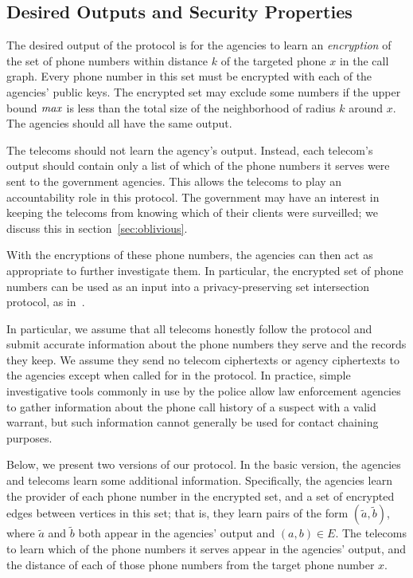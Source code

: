 \subsection{Desired Outputs and Security Properties}

The desired output of the protocol is for the agencies to learn an \emph{encryption} of the set of phone numbers within distance $k$ of the targeted phone $x$ in the call graph. Every phone number in this set must be encrypted with each of the agencies' public keys. The encrypted set may exclude some numbers if the upper bound $\mathit{max}$ is less than the total size of the neighborhood of radius $k$ around $x$. The agencies should all have the same output.

The telecoms should not learn the agency's output. Instead, each telecom's output should contain only a list of which of the phone numbers it serves were sent to the government agencies. This allows the telecoms to play an accountability role in this protocol. The government may have an interest in keeping the telecoms from knowing which of their clients were surveilled; we discuss this in section~\ref{sec:oblivious}.

With the encryptions of these phone numbers, the agencies can then act as appropriate to further investigate them. In particular, the encrypted set of phone numbers can be used as an input into a privacy-preserving set intersection protocol, as in~\cite{bandits}.

In particular, we assume that all telecoms honestly follow the protocol and submit accurate information about the phone numbers they serve and the records they keep. We assume they send no telecom ciphertexts or agency ciphertexts to the agencies except when called for in the protocol. In practice, simple investigative tools commonly in use by the police allow law enforcement agencies to gather information about the phone call history of a suspect with a valid warrant, but such information cannot generally be used for contact chaining purposes.

Below, we present two versions of our protocol. In the basic version, the agencies and telecoms learn some additional information. Specifically, the agencies learn the provider of each phone number in the encrypted set, and a set of encrypted edges between vertices in this set; that is, they learn pairs of the form $(\tilde{a}, \tilde{b})$, where $\tilde{a}$ and $\tilde{b}$ both appear in the agencies' output and $(a, b)\in E$. The telecoms to learn which of the phone numbers it serves appear in the agencies' output, and the distance of each of those phone numbers from the target phone number $x$.

